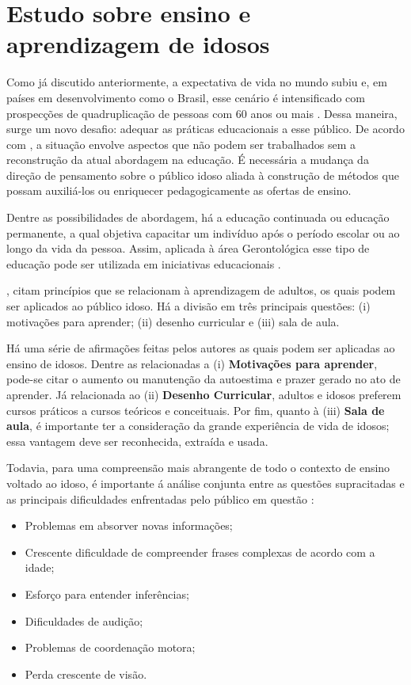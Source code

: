 \section{Estudo sobre ensino e aprendizagem de idosos}

Como já discutido anteriormente, a expectativa de vida no mundo subiu e, em países em desenvolvimento como o Brasil, esse cenário é intensificado com prospecções de quadruplicação de pessoas com 60 anos ou mais \citep{demografico2010disponivel}. Dessa maneira, surge um novo desafio: adequar as práticas educacionais a esse público. De acordo com \cite{rethinkingTeacherEducation}, a situação envolve aspectos que não podem ser trabalhados sem a reconstrução da atual abordagem na educação. É necessária a mudança da direção de pensamento sobre o público idoso aliada à construção de métodos que possam auxiliá-los ou enriquecer pedagogicamente as ofertas de ensino.

Dentre as possibilidades de abordagem, há a educação continuada ou educação permanente, a qual objetiva capacitar um indivíduo após o período escolar ou ao longo da vida da pessoa. Assim, aplicada à área Gerontológica esse tipo de educação pode ser utilizada em iniciativas educacionais \citep{neri2001palavras}. 

\cite{zemke198430}, citam princípios que se relacionam à aprendizagem de adultos, os quais podem ser aplicados ao público idoso. Há a divisão em três principais questões: (i) motivações para aprender; (ii) desenho curricular e (iii) sala de aula. 

Há uma série de afirmações feitas pelos autores as quais podem ser aplicadas ao ensino de idosos. Dentre as relacionadas a (i) \textbf{Motivações para aprender}, pode-se citar o aumento ou manutenção da autoestima e prazer gerado no ato de aprender. Já relacionada ao (ii) \textbf{Desenho Curricular}, adultos e idosos preferem cursos práticos a cursos teóricos e conceituais. Por fim, quanto à (iii) \textbf{Sala de aula}, é importante ter a consideração da grande experiência de vida de idosos; essa vantagem deve ser reconhecida, extraída e usada.


Todavia, para uma compreensão mais abrangente de todo o contexto de ensino voltado ao idoso, é importante á análise conjunta entre as questões supracitadas e as principais dificuldades enfrentadas pelo público em questão \citep{euromed}:

\begin{itemize}
    \item Problemas em absorver novas informações;
    \item Crescente dificuldade de compreender frases complexas de acordo com a idade;
    \item Esforço para entender inferências;
    \item Dificuldades de audição;
    \item Problemas de coordenação motora;
    \item Perda crescente de visão.
\end{itemize}

